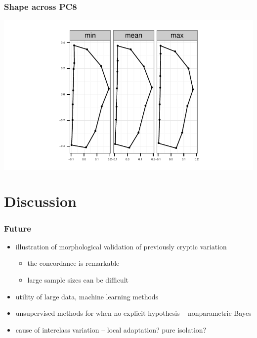 \documentclass{beamer}\usepackage{graphicx, color}
\makeatletter
\def\maxwidth{ %
  \ifdim\Gin@nat@width>\linewidth
    \linewidth
  \else
    \Gin@nat@width
  \fi
}
\newenvironment{knitrout}{}{} %
\makeatother
\begin{document}
\begin{frame}
  \frametitle{Shape across PC8}
\begin{knitrout}
\color{fgcolor}
\includegraphics[width=\maxwidth]{figure/unnamed-chunk-8} 

\end{knitrout}

\end{frame}


\section{Discussion}
\begin{frame}
  \frametitle{Future}

  \begin{itemize}
    \item illustration of morphological validation of previously cryptic variation
      \begin{itemize}
        \item the concordance is remarkable
        \item large sample sizes can be difficult
      \end{itemize}
    \item utility of large data, machine learning methods 
    \item unsupervised methods for when no explicit hypothesis -- nonparametric Bayes
    \item cause of interclass variation -- local adaptation? pure isolation?
  \end{itemize}

\end{frame}
\end{document}
